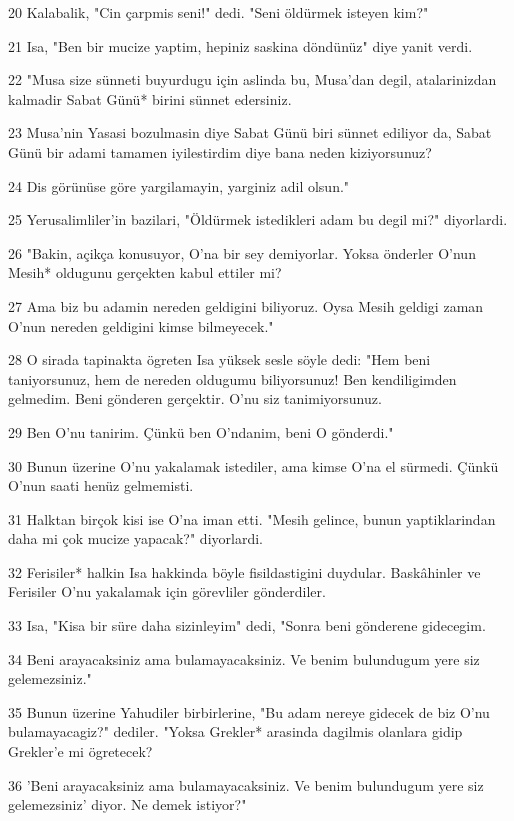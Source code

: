 \par 20 Kalabalik, "Cin çarpmis seni!" dedi. "Seni öldürmek isteyen kim?"
\par 21 Isa, "Ben bir mucize yaptim, hepiniz saskina döndünüz" diye yanit verdi.
\par 22 "Musa size sünneti buyurdugu için aslinda bu, Musa'dan degil, atalarinizdan kalmadir Sabat Günü* birini sünnet edersiniz.
\par 23 Musa'nin Yasasi bozulmasin diye Sabat Günü biri sünnet ediliyor da, Sabat Günü bir adami tamamen iyilestirdim diye bana neden kiziyorsunuz?
\par 24 Dis görünüse göre yargilamayin, yarginiz adil olsun."
\par 25 Yerusalimliler'in bazilari, "Öldürmek istedikleri adam bu degil mi?" diyorlardi.
\par 26 "Bakin, açikça konusuyor, O'na bir sey demiyorlar. Yoksa önderler O'nun Mesih* oldugunu gerçekten kabul ettiler mi?
\par 27 Ama biz bu adamin nereden geldigini biliyoruz. Oysa Mesih geldigi zaman O'nun nereden geldigini kimse bilmeyecek."
\par 28 O sirada tapinakta ögreten Isa yüksek sesle söyle dedi: "Hem beni taniyorsunuz, hem de nereden oldugumu biliyorsunuz! Ben kendiligimden gelmedim. Beni gönderen gerçektir. O'nu siz tanimiyorsunuz.
\par 29 Ben O'nu tanirim. Çünkü ben O'ndanim, beni O gönderdi."
\par 30 Bunun üzerine O'nu yakalamak istediler, ama kimse O'na el sürmedi. Çünkü O'nun saati henüz gelmemisti.
\par 31 Halktan birçok kisi ise O'na iman etti. "Mesih gelince, bunun yaptiklarindan daha mi çok mucize yapacak?" diyorlardi.
\par 32 Ferisiler* halkin Isa hakkinda böyle fisildastigini duydular. Baskâhinler ve Ferisiler O'nu yakalamak için görevliler gönderdiler.
\par 33 Isa, "Kisa bir süre daha sizinleyim" dedi, "Sonra beni gönderene gidecegim.
\par 34 Beni arayacaksiniz ama bulamayacaksiniz. Ve benim bulundugum yere siz gelemezsiniz."
\par 35 Bunun üzerine Yahudiler birbirlerine, "Bu adam nereye gidecek de biz O'nu bulamayacagiz?" dediler. "Yoksa Grekler* arasinda dagilmis olanlara gidip Grekler'e mi ögretecek?
\par 36 'Beni arayacaksiniz ama bulamayacaksiniz. Ve benim bulundugum yere siz gelemezsiniz' diyor. Ne demek istiyor?"
